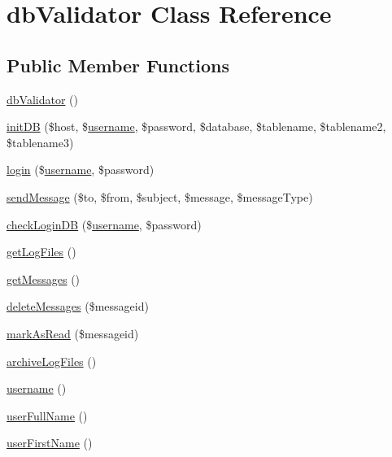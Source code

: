 \hypertarget{classdb_validator}{\section{db\-Validator Class Reference}
\label{classdb_validator}
}
\subsection*{Public Member Functions}
\begin{DoxyCompactItemize}
\item 
\hyperlink{classdb_validator_a435645149bfe52fdd81b83852122e5a1}{db\-Validator} ()
\item 
\hyperlink{classdb_validator_ad6a1c58aff12aedff7e0beb6f38514c4}{init\-D\-B} (\$host, \$\hyperlink{classdb_validator_a7475524fbb2e38dd6c9f7a6661b0bb81}{username}, \$password, \$database, \$tablename, \$tablename2, \$tablename3)
\item 
\hyperlink{classdb_validator_ad870c94a5775868891f6c50b9818d627}{login} (\$\hyperlink{classdb_validator_a7475524fbb2e38dd6c9f7a6661b0bb81}{username}, \$password)
\item 
\hyperlink{classdb_validator_abec8e80a38381c53efd3dc68278effbf}{send\-Message} (\$to, \$from, \$subject, \$message, \$message\-Type)
\item 
\hyperlink{classdb_validator_a10f97b8f1c865ad4df98089b55375904}{check\-Login\-D\-B} (\$\hyperlink{classdb_validator_a7475524fbb2e38dd6c9f7a6661b0bb81}{username}, \$password)
\item 
\hyperlink{classdb_validator_ac552a64e58f1622acd9ce5d8dd16a1cd}{get\-Log\-Files} ()
\item 
\hyperlink{classdb_validator_a7347b0b89cca1d7604e93f5b5e896fc4}{get\-Messages} ()
\item 
\hyperlink{classdb_validator_a53da26de78548953a6858e880f5dc816}{delete\-Messages} (\$messageid)
\item 
\hyperlink{classdb_validator_af4c269840e9d50b9dd4f0d96fa1146f4}{mark\-As\-Read} (\$messageid)
\item 
\hyperlink{classdb_validator_a224569f7d96cd6b501b4e9b6fabb6ccd}{archive\-Log\-Files} ()
\item 
\hyperlink{classdb_validator_a7475524fbb2e38dd6c9f7a6661b0bb81}{username} ()
\item 
\hyperlink{classdb_validator_a81a47eeb08046245d1cd0c80c2d70daa}{user\-Full\-Name} ()
\item 
\hyperlink{classdb_validator_aa27eec2b94f77b764a09f36b9a4885e7}{user\-First\-Name} ()

\end{DoxyCompactItemize}
